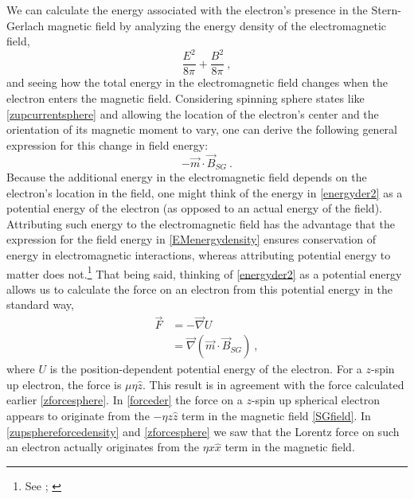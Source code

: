 \documentclass[onecolumn,secnumarabic,amsmath,amssymb,balancelastpage,nofootinbib]{article}
\begin{document}
We can calculate the energy associated with the electron's presence in the Stern-Gerlach magnetic field by analyzing the energy density of the electromagnetic field,
\begin{equation}
\frac{E^2}{8 \pi} + \frac{B^2}{8 \pi}
\ ,
\label{EMenergydensity}
\end{equation}
and seeing how the total energy in the electromagnetic field changes when the electron enters the magnetic field.  Considering spinning sphere states like \eqref{zupcurrentsphere} and allowing the location of the electron's center and the orientation of its magnetic moment to vary, one can derive the following general expression for this change in field energy:
\begin{equation}
- \vec{m} \cdot \vec{B}_{SG}
\ .
\label{energyder2}
\end{equation}
Because the additional energy in the electromagnetic field depends on the electron's location in the field, one might think of the energy in \eqref{energyder2} as a potential energy of the electron (as opposed to an actual energy of the field).  Attributing such energy to the electromagnetic field has the advantage that the expression for the field energy in \eqref{EMenergydensity} ensures conservation of energy in electromagnetic interactions, whereas attributing potential energy to matter does not.\footnote{See \citet[sec.\ 15.6]{feynman2}; \citet[ch.\ 5]{lange}}  That being said, thinking of \eqref{energyder2} as a potential energy allows us to calculate the force on an electron from this potential energy in the standard way,
\begin{align}
\vec{F}&= - \vec{\nabla} U
\nonumber
\\
&= \vec{\nabla} \left(\vec{m}\cdot\vec{B}_{SG} \right)
\ ,
\label{forceder}
\end{align}
where $U$ is the position-dependent potential energy of the electron.  For a $z$-spin up electron, the force is $\mu \eta \hat{z}$.  This result is in agreement with the force calculated earlier \eqref{zforcesphere}.  In \eqref{forceder} the force on a $z$-spin up spherical electron appears to originate from the $- \eta z\hat{z}$ term in the magnetic field \eqref{SGfield}.  In \eqref{zupsphereforcedensity} and \eqref{zforcesphere} we saw that the Lorentz force on such an electron actually originates from the $\eta x \hat{x}$ term in the magnetic field.
\end{document}
